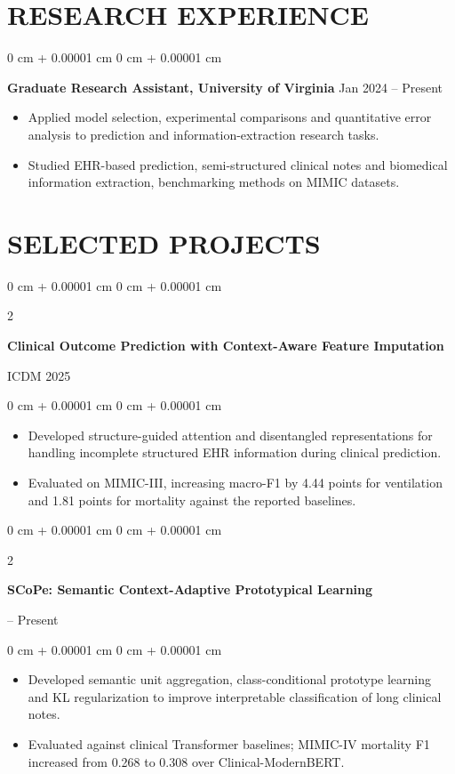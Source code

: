 \documentclass[10pt, letterpaper]{article}
\newenvironment{highlights}{
    \begin{itemize}[
        topsep=0.03 cm,
        parsep=0.03 cm,
        partopsep=0pt,
        itemsep=0pt,
        leftmargin=0 cm + 10pt
    ]
}{
    \end{itemize}
} %
\newenvironment{onecolentry}{
    \begin{adjustwidth}{
        0 cm + 0.00001 cm
    }{
        0 cm + 0.00001 cm
    }
}{
    \end{adjustwidth}
} %
\newenvironment{twocolentry}[2][]{
    \onecolentry
    \def\secondColumn{#2}
    \setcolumnwidth{\fill, 4.5 cm}
    \begin{paracol}{2}
}{
    \switchcolumn \raggedleft \secondColumn
    \end{paracol}
    \endonecolentry
} %
\begin{document}
\section{RESEARCH EXPERIENCE}
\begin{onecolentry}
\textbf{Graduate Research Assistant, University of Virginia} \hfill Jan 2024 -- Present
\begin{highlights}
\item Applied model selection, experimental comparisons and quantitative error analysis to prediction and information-extraction research tasks.
\item Studied EHR-based prediction, semi-structured clinical notes and biomedical information extraction, benchmarking methods on MIMIC datasets.
\end{highlights}
\end{onecolentry}
\section{SELECTED PROJECTS}
\begin{twocolentry}{ICDM 2025}
\textbf{Clinical Outcome Prediction with Context-Aware Feature Imputation}
\end{twocolentry}
\begin{onecolentry}
\begin{highlights}
\item Developed structure-guided attention and disentangled representations for handling incomplete structured EHR information during clinical prediction.
\item Evaluated on MIMIC-III, increasing macro-F1 by 4.44 points for ventilation and 1.81 points for mortality against the reported baselines.
\end{highlights}
\end{onecolentry}
\vspace{0.035 cm}

\begin{twocolentry}{2026 -- Present}
\textbf{SCoPe: Semantic Context-Adaptive Prototypical Learning}
\end{twocolentry}
\begin{onecolentry}
\begin{highlights}
\item Developed semantic unit aggregation, class-conditional prototype learning and KL regularization to improve interpretable classification of long clinical notes.
\item Evaluated against clinical Transformer baselines; MIMIC-IV mortality F1 increased from 0.268 to 0.308 over Clinical-ModernBERT.
\end{highlights}
\end{onecolentry}
\vspace{0.035 cm}
\end{document}

